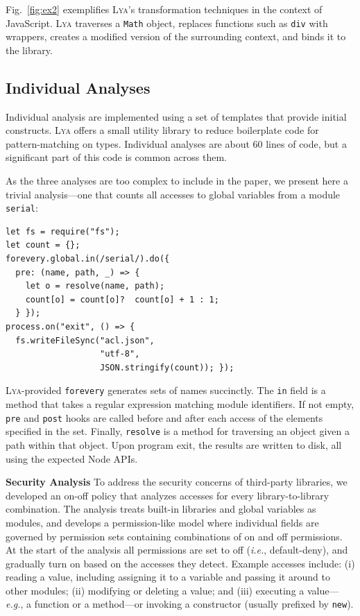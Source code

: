 \documentclass[letterpaper,twocolumn,10pt]{article}
\def\eg{{\em e.g.}, }
\def\ie{{\em i.e.}, }
\newcommand{\heading}[1]{\vspace{2pt}\noindent\textbf{#1}\enspace}
\newcommand{\ttt}[1]{\texttt{#1}}
\newcommand{\sys}{{\scshape Lya}\xspace}
\begin{document}
Fig.~\ref{fig:ex2} exemplifies \sys's transformation techniques in the context of JavaScript.
\sys traverses a \ttt{Math} object, replaces functions such as \ttt{div} with wrappers, creates a modified version of the surrounding context, and binds it to the library.


\subsection{Individual Analyses}
\label{impl2}

Individual analysis are implemented using a set of templates that provide initial constructs.
\sys offers a small utility library to reduce boilerplate code for pattern-matching on types.
Individual analyses are about 60 lines of code, but a significant part of this code is common across them.

As the three analyses are too complex to include in the paper, we present here a trivial analysis---one that counts all accesses to global variables from a module \ttt{serial}:

\begin{lstlisting}
let fs = require("fs");
let count = {};
forevery.global.in(/serial/).do({
  pre: (name, path, _) => {
    let o = resolve(name, path);
    count[o] = count[o]?  count[o] + 1 : 1;
  } });
process.on("exit", () => {
  fs.writeFileSync("acl.json",
                   "utf-8",
                   JSON.stringify(count)); });
\end{lstlisting}

\noindent
\sys-provided \ttt{forevery} generates sets of names succinctly.
The \ttt{in} field is a method that takes a regular expression matching module identifiers.
If not empty, \ttt{pre} and \ttt{post} hooks are called before and after each access of the elements specified in the set.
Finally, \ttt{resolve} is a method for traversing an object given a path within that object.
Upon program exit, the results are written to disk, all using the expected Node APIs.

\heading{Security Analysis}
To address the security concerns of third-party libraries, we developed an on-off policy that analyzes accesses for every library-to-library combination.
The analysis treats built-in libraries and global variables as modules,
and develops a permission-like model where individual fields are governed by permission sets containing combinations of on and off permissions.
At the start of the analysis all permissions are set to off (\ie default-deny), and gradually turn on based on the accesses they detect.
Example accesses include:
 (i) reading a value, including assigning it to a variable and passing it around to other modules;
 (ii) modifying or deleting a value; and
 (iii)  executing a value---\eg a function or a method---or invoking a constructor (usually prefixed by \ttt{new}).
\end{document}
